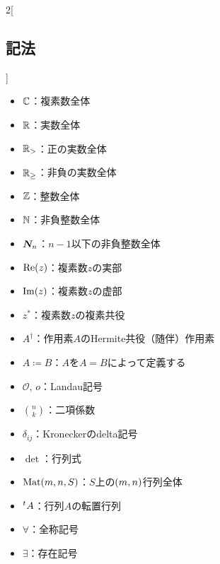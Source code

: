 \documentclass[b5paper,draft,oneside,openany]{ltjsbook} %
\begin{document}
\columnseprule=0.5pt
\begin{multicols}{2}[\subsection*{記法}]
    \begin{itemize}
        \item $\mathbb{C}$：複素数全体
        \item $\mathbb{R}$：実数全体
        \item $\mathbb{R}_{>}$：正の実数全体
        \item $\mathbb{R}_{\geq}$：非負の実数全体
        \item $\mathbb{Z}$：整数全体
        \item $\mathbb{N}$：非負整数全体
        \item $\bm{N}_{n}$：$n-1$以下の非負整数全体
        \item $\re{z}$：複素数$z$の実部
        \item $\im{z}$：複素数$z$の虚部
        \item $z^*$：複素数$z$の複素共役
        \item $A^\dagger$：作用素$A$のHermite共役（随伴）作用素
        \item $A\coloneqq B$：$A$を$A=B$によって定義する
        \item $\mathcal{O}$, $o$：Landau記号
        \item $\binom{n}{k}$：二項係数
        \item $\delta_{ij}$：Kroneckerのdelta記号
        \item $\det$：行列式
        \item $\Mat{m}{n}{S}$：$S$上の$\pare{m,n}$行列全体
        \item ${}^t{A}$：行列$A$の転置行列
        \item $\forall$：全称記号
        \item $\exists$：存在記号
    \end{itemize}
\end{multicols}
\columnseprule=0.0pt
\end{document}
